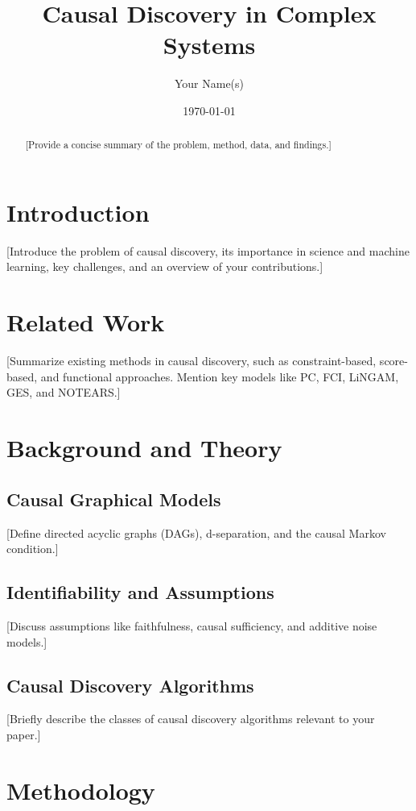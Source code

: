 \documentclass[a4paper]{article}
\title{Causal Discovery in Complex Systems}
\author{Your Name(s)}
\date{\today}
\begin{document}
\maketitle

\begin{abstract}
[Provide a concise summary of the problem, method, data, and findings.]
\end{abstract}

\section{Introduction}
\label{sec:introduction}

[Introduce the problem of causal discovery, its importance in science and machine learning, key challenges, and an overview of your contributions.]

\section{Related Work}
\label{sec:related-work}

[Summarize existing methods in causal discovery, such as constraint-based, score-based, and functional approaches. Mention key models like PC, FCI, LiNGAM, GES, and NOTEARS.]

\section{Background and Theory}
\label{sec:background}

\subsection{Causal Graphical Models}
[Define directed acyclic graphs (DAGs), d-separation, and the causal Markov condition.]

\subsection{Identifiability and Assumptions}
[Discuss assumptions like faithfulness, causal sufficiency, and additive noise models.]

\subsection{Causal Discovery Algorithms}
[Briefly describe the classes of causal discovery algorithms relevant to your paper.]

\section{Methodology}
\label{sec:methodology}
\end{document}
